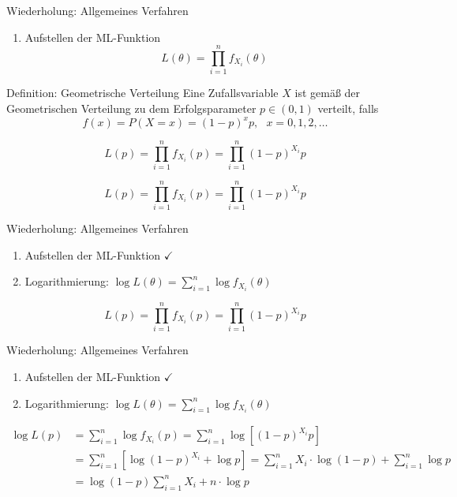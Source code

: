 \documentclass[t,11pt]{beamer}
\begin{document}
\begin{frame}
\begin{exampleblock}{Wiederholung: Allgemeines Verfahren}
	\begin{enumerate}
		\item Aufstellen der ML-Funktion $$L(\theta)=\prod_{i=1}^{n}f_{X_i}(\theta)$$
	\end{enumerate}
\end{exampleblock}
\begin{alertblock}{Definition: Geometrische Verteilung}
	Eine Zufallsvariable $X$ ist gemäß der Geometrischen Verteilung zu dem Erfolgsparameter $p\in (0,1)$ verteilt, falls
	\begin{equation*}
	f(x)=P(X=x)=(1-p)^xp, \ \ \ x=0,1,2,\dots
	\end{equation*}
\end{alertblock}
$$L(p)=\prod_{i=1}^{n}f_{X_i}(p)=\prod_{i=1}^{n}(1-p)^{X_i}p$$
\end{frame}

\begin{frame}
	$$L(p)=\prod_{i=1}^{n}f_{X_i}(p)=\prod_{i=1}^{n}(1-p)^{X_i}p$$
	\begin{exampleblock}{Wiederholung: Allgemeines Verfahren}
		\begin{enumerate}
			\item Aufstellen der ML-Funktion $\checkmark$
			\item Logarithmierung: $\log L(\theta)=\sum_{i=1}^{n}\log f_{X_i}(\theta)$
		\end{enumerate}
	\end{exampleblock}
\end{frame}

\begin{frame}
$$L(p)=\prod_{i=1}^{n}f_{X_i}(p)=\prod_{i=1}^{n}(1-p)^{X_i}p$$
\begin{exampleblock}{Wiederholung: Allgemeines Verfahren}
	\begin{enumerate}
		\item Aufstellen der ML-Funktion $\checkmark$
		\item Logarithmierung: $\log L(\theta)=\sum_{i=1}^{n}\log f_{X_i}(\theta)$
	\end{enumerate}
\end{exampleblock}
\begin{align*}
\log L(p) &= \sum_{i=1}^{n}\log f_{X_i}(p) = \sum_{i=1}^{n}\log \left[ (1-p)^{X_i}p \right] \\
&= \sum_{i=1}^{n} \left[ \log (1-p)^{X_i} + \log p \right] = \sum_{i=1}^{n} X_i \cdot  \log (1-p) + \sum_{i=1}^{n} \log p \\
&= \log (1-p) \sum_{i=1}^{n} X_i + n\cdot \log p
\end{align*}
\end{frame}
\end{document}
